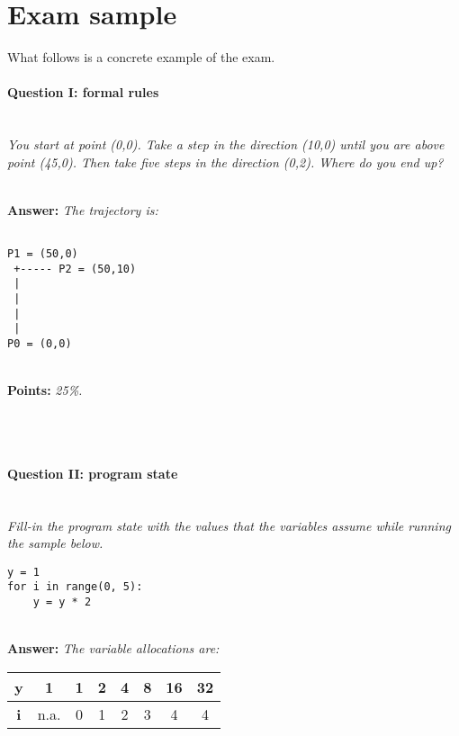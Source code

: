 \section*{Exam sample}
What follows is a concrete example of the exam.


\paragraph{Question I: formal rules} \ \\

\textit{You start at point (0,0). Take a step in the direction (10,0) until you are above point (45,0). Then take five steps in the direction (0,2). Where do you end up?}

\ \\ 

\textbf{Answer:} \textit{The trajectory is:}

\begin{lstlisting}

P1 = (50,0)
 +----- P2 = (50,10)
 |
 |
 |
 |
P0 = (0,0)
\end{lstlisting}

\ \\ 

\textbf{Points:} \textit{25\%.}

\ \\ 
\ \\ 

\paragraph{Question II: program state} \ \\ 

\textit{Fill-in the program state with the values that the variables assume while running the sample below.}

\begin{lstlisting}
y = 1
for i in range(0, 5):
    y = y * 2
\end{lstlisting}

\ \\ 

\textbf{Answer:} \textit{The variable allocations are:}

\begin{tabular}{| c | c | c | c | c | c | c | c |}
\hline
\textbf{y} & 1 & 1 & 2 & 4 & 8 & 16 & 32 \\
\hline
\textbf{i} & n.a. & 0 & 1 & 2 & 3 & 4 & 4 \\
\hline
\end{tabular}

